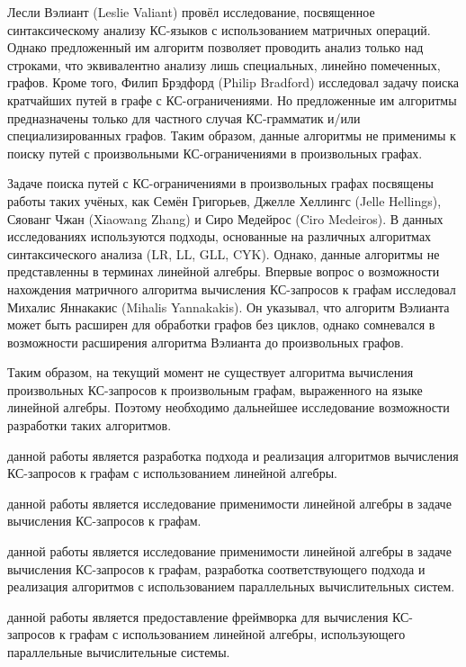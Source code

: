 Лесли Вэлиант (Leslie Valiant) провёл исследование, посвященное синтаксическому анализу КС-языков с использованием матричных операций. Однако предложенный им алгоритм позволяет проводить анализ только над строками, что эквивалентно анализу лишь специальных, линейно помеченных, графов. 
Кроме того, Филип Брэдфорд (Philip Bradford) исследовал задачу поиска кратчайших путей в графе с КС-ограничениями. Но предложенные им алгоритмы предназначены только для частного случая КС-грамматик и/или специализированных графов. Таким образом, данные алгоритмы не применимы к поиску путей с произвольными КС-ограничениями в произвольных графах.

Задаче поиска путей с КС-ограничениями в произвольных графах посвящены работы таких учёных, как Семён Григорьев, Джелле Хеллингс (Jelle Hellings), Сяованг Чжан (Xiaowang Zhang) и Сиро Медейрос (Ciro Medeiros). В данных исследованиях используются подходы, основанные на различных алгоритмах синтаксического анализа (LR, LL, GLL, CYK). Однако, данные алгоритмы не представленны в терминах линейной алгебры. Впервые вопрос о возможности нахождения матричного алгоритма вычисления КС-запросов к графам исследовал Михалис Яннакакис (Mihalis Yannakakis). Он указывал, что алгоритм Вэлианта может быть расширен для обработки графов без циклов, однако сомневался в возможности расширения алгоритма Вэлианта до произвольных графов.

Таким образом, на текущий момент не существует алгоритма вычисления произвольных КС-запросов к произвольным графам, выраженного на языке линейной алгебры. Поэтому необходимо дальнейшее исследование возможности разработки таких алгоритмов.

{\aim} данной работы является разработка подхода и реализация алгоритмов вычисления КС-запросов к графам с использованием линейной алгебры.

{\aim} данной работы является исследование применимости линейной алгебры в задаче вычисления КС-запросов к графам.

{\aim} данной работы является исследование применимости линейной алгебры в задаче вычисления КС-запросов к графам, разработка соответствующего подхода и реализация алгоритмов с использованием параллельных вычислительных систем.

{\aim} данной работы является предоставление фреймворка для вычисления КС-запросов к графам с использованием линейной алгебры, использующего параллельные вычислительные системы.

